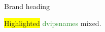 \documentclass{article}
\begin{document}
\textcolor{brand}{\Large Brand heading}\par
\lipsum[1]
\colorbox{yellow}{Highlighted}  \textcolor{ForestGreen}{dvipsnames} \textcolor{blue!40!black}{mixed}.
{\color{Maroon}\lipsum[2]}
\newpage
{}
\lipsum[3]
\restoregeometry
\end{document}
